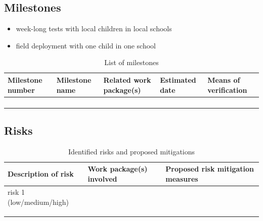 \documentclass[11pt]{report}
\begin{document}
\subsection{Milestones}\label{milestones}

\begin{itemize}

\item   week-long tests with local children in local schools
\item   field deployment with one child in one school
\end{itemize}

\begin{table}[!htbp]
\caption{List of milestones}
\centering
\begin{tabular}{@{}lllll@{}}
\toprule
\textbf{Milestone number} & \textbf{Milestone name} & \textbf{Related work package(s)} & \textbf{Estimated date} & \textbf{Means of verification} \\ \midrule
                          &                         &                                  &                         &                                \\
                          &                         &                                  &                         &                                \\
                          &                         &                                  &                         &                                \\
                          &                         &                                  &                         &                                \\ \bottomrule
\end{tabular}
\end{table}


\subsection{Risks}\label{risks}

\begin{table}[!htbp]
\caption{Identified risks and proposed mitigations}
\centering
\begin{tabular}{@{}lll@{}}
\toprule
\textbf{Description of risk} & \textbf{Work package(s) involved} & \textbf{Proposed risk mitigation measures} \\ \midrule
risk 1 (low/medium/high)     &                                   &                                            \\
                             &                                   &                                            \\
                             &                                   &                                            \\
                             &                                   &                                            \\ \bottomrule
\end{tabular}
\end{table}
\end{document}
